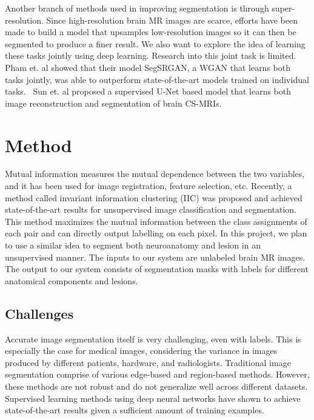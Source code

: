 \documentclass{article}
\begin{document}
Another branch of methods used in improving segmentation is through super-resolution. Since high-resolution brain MR images are scarce, efforts have been made to build a model that upsamples low-resolution images so it can then be segmented to produce a finer result. We also want to explore the idea of learning these tasks jointly using deep learning. Research into this joint task is limited. Pham et. al showed that their model SegSRGAN, a WGAN that learns both tasks jointly, was able to outperform state-of-the-art models trained on individual tasks.~\cite{pham:hal-01895163} Sun et. al proposed a supervised U-Net based model that learns both image reconstruction and segmentation of brain CS-MRIs.~\cite{sun2018joint}


\section{Method}
Mutual information measures the mutual dependence between the two variables, and it has been used for image registration, feature selection, etc. Recently, a method called invariant information clustering (IIC) was proposed and achieved state-of-the-art results for unsupervised image classification and segmentation.~\cite{ji2018invariant} This method maximizes the mutual information between the class assignments of each pair and can directly output labelling on each pixel. In this project, we plan to use a similar idea to segment both neuroanatomy and lesion in an unsupervised manner. The inputs to our system are unlabeled brain MR images. The output to our system consists of segmentation masks with labels for different anatomical components and lesions.

\subsection{Challenges}
Accurate image segmentation itself is very challenging, even with labels. This is especially the case for medical images, considering the variance in images produced by different patients, hardware, and radiologists. Traditional image segmentation comprise of various edge-based and region-based methods.\cite{segmentation_survey} However, these methods are not robust and do not generalize well across different datasets. Supervised learning methods using deep neural networks have shown to achieve state-of-the-art results given a sufficient amount of training examples. 
\end{document}
